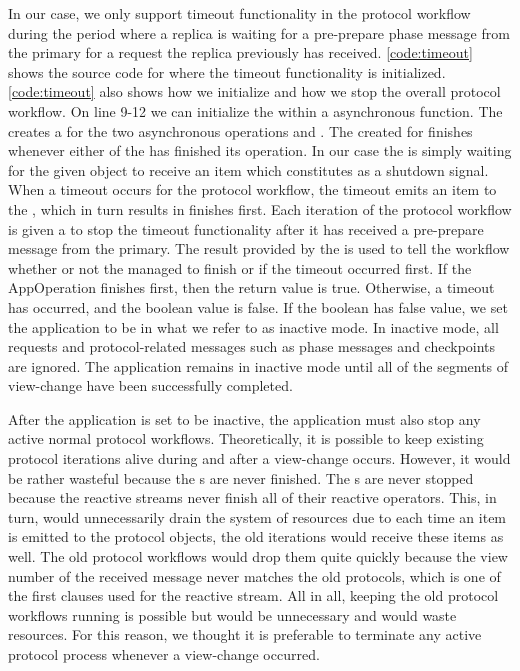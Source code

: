 In our case, we only support timeout functionality in the protocol workflow during the period where a replica is waiting for a pre-prepare phase message from the primary for a request the replica previously has received. \autoref{code:timeout} shows the source code for where the timeout functionality is initialized. \autoref{code:timeout} also shows how we initialize and how we stop the overall protocol workflow. On line 9-12 we can initialize the  within a  asynchronous function. The  creates a  for the two asynchronous  operations  and . The  created for  finishes whenever either of the  has finished its operation. In our case the  is simply waiting for the given  object  to receive an item which constitutes as a shutdown signal. When a timeout occurs for the protocol workflow, the timeout emits an item to the , which in turn results in  finishes first. Each iteration of the protocol workflow is given a  to stop the timeout functionality after it has received a pre-prepare message from the primary. The  result provided by the  is used to tell the workflow whether or not the  managed to finish or if the timeout occurred first. If the AppOperation finishes first, then the return value is true. Otherwise, a timeout has occurred, and the boolean value is false.  If the boolean has false value, we set the application to be in what we refer to as inactive mode. In inactive mode, all requests and protocol-related messages such as phase messages and checkpoints are ignored. The application remains in inactive mode until all of the segments of view-change have been successfully completed. 

After the application is set to be inactive, the application must also stop any active normal protocol workflows. Theoretically, it is possible to keep existing protocol iterations alive during and after a view-change occurs. However, it would be rather wasteful because the s are never finished. The s are never stopped because the reactive streams never finish all of their reactive operators. This, in turn, would unnecessarily drain the system of resources due to each time an item is emitted to the protocol  objects, the old iterations would receive these items as well. The old protocol workflows would drop them quite quickly because the view number of the received message never matches the old protocols, which is one of the first  clauses used for the reactive stream. All in all, keeping the old protocol workflows running is possible but would be unnecessary and would waste resources. For this reason, we thought it is preferable to terminate any active protocol process whenever a view-change occurred. 

